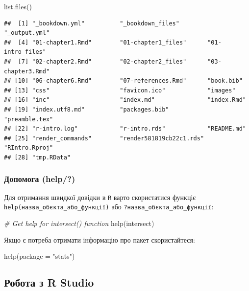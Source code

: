 \documentclass[
]{book}
\newenvironment{Shaded}{\begin{snugshade}}{\end{snugshade}}
\newcommand{\AttributeTok}[1]{\textcolor[rgb]{0.77,0.63,0.00}{#1}}
\newcommand{\CommentTok}[1]{\textcolor[rgb]{0.56,0.35,0.01}{\textit{#1}}}
\newcommand{\FunctionTok}[1]{\textcolor[rgb]{0.00,0.00,0.00}{#1}}
\newcommand{\NormalTok}[1]{#1}
\newcommand{\StringTok}[1]{\textcolor[rgb]{0.31,0.60,0.02}{#1}}
\begin{document}
\begin{Shaded}
\begin{Highlighting}[]
\FunctionTok{list.files}\NormalTok{()}
\end{Highlighting}
\end{Shaded}

\begin{verbatim}
##  [1] "_bookdown.yml"          "_bookdown_files"        "_output.yml"           
##  [4] "01-chapter1.Rmd"        "01-chapter1_files"      "01-intro_files"        
##  [7] "02-chapter2.Rmd"        "02-chapter2_files"      "03-chapter3.Rmd"       
## [10] "06-chapter6.Rmd"        "07-references.Rmd"      "book.bib"              
## [13] "css"                    "favicon.ico"            "images"                
## [16] "inc"                    "index.md"               "index.Rmd"             
## [19] "index.utf8.md"          "packages.bib"           "preamble.tex"          
## [22] "r-intro.log"            "r-intro.rds"            "README.md"             
## [25] "render_commands"        "render581819cb22c1.rds" "RIntro.Rproj"          
## [28] "tmp.RData"
\end{verbatim}

\hypertarget{chapter1315}{%
\subsubsection{Допомога (help/?)}\label{chapter1315}}

Для отримання швидкої довідки в \texttt{R} варто скористатися функціє \texttt{help(назва\_об\textquotesingle{}єкта\_або\_функції)} або \texttt{?назва\_об\textquotesingle{}єкта\_або\_функції}:

\begin{Shaded}
\begin{Highlighting}[]
\CommentTok{\# Get help for intersect() function}
\FunctionTok{help}\NormalTok{(intersect)}
\end{Highlighting}
\end{Shaded}

Якщо є потреба отримати інформацію про пакет скористайтеся:

\begin{Shaded}
\begin{Highlighting}[]
\FunctionTok{help}\NormalTok{(}\AttributeTok{package =} \StringTok{"stats"}\NormalTok{)}
\end{Highlighting}
\end{Shaded}

\hypertarget{chapter132}{%
\subsection{Робота з R Studio}\label{chapter132}}
\end{document}
